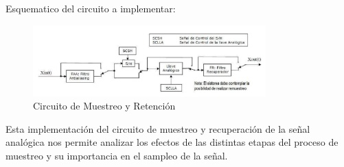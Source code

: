 Esquematico del circuito a implementar:

\begin{figure}[H]
    \centering
    \includegraphics[width=0.8\textwidth]{Imagenes/Circuito_Muestreo.png}
    \caption{Circuito de Muestreo y Retención}
    \label{fig:Circuito_Muestreo}
\end{figure}
Esta implementación del circuito de muestreo y recuperación de la señal analógica nos permite analizar 
los efectos de las distintas etapas del proceso de muestreo y su importancia en el sampleo de la señal.
